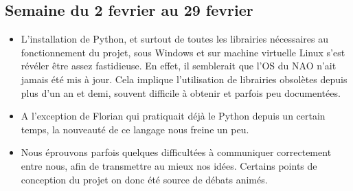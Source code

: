   \subsection{Semaine du 2 fevrier au 29 fevrier}
  \label{sub:Semaine du 2 fevrier au 29 fevrier}
    \begin{itemize}
      \item L'installation de Python, et surtout de toutes les librairies nécessaires au fonctionnement du projet, sous Windows et sur machine virtuelle Linux s'est révéler être assez fastidieuse.
      En effet, il semblerait que l'OS du NAO n'ait jamais été mis à jour. Cela implique l’utilisation de librairies obsolètes depuis plus d’un an et demi, souvent difficile à obtenir et parfois peu documentées.
      \item A l'exception de Florian qui pratiquait déjà le Python depuis un certain temps, la nouveauté de ce langage nous freine un peu.
      \item Nous éprouvons parfois quelques difficultées à communiquer correctement entre nous, afin de transmettre au mieux nos idées.
      Certains points de conception du projet on donc été source de débats animés.\\
    \end{itemize}



